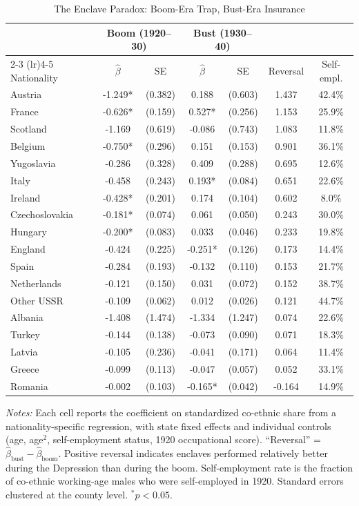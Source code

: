 \begin{table}[t]
\centering
\caption{The Enclave Paradox: Boom-Era Trap, Bust-Era Insurance}
\label{tab:paradox}
\begin{tabular}{lcccccc}
\hline\hline
 & \multicolumn{2}{c}{Boom (1920--30)} & \multicolumn{2}{c}{Bust (1930--40)} & & \\
\cmidrule(lr){2-3} \cmidrule(lr){4-5}
Nationality & $\hat{\beta}$ & SE & $\hat{\beta}$ & SE & Reversal & Self-empl. \\
\hline
Austria & -1.249* & (0.382) & 0.188 & (0.603) & 1.437 & 42.4\% \\
France & -0.626* & (0.159) & 0.527* & (0.256) & 1.153 & 25.9\% \\
Scotland & -1.169 & (0.619) & -0.086 & (0.743) & 1.083 & 11.8\% \\
Belgium & -0.750* & (0.296) & 0.151 & (0.153) & 0.901 & 36.1\% \\
Yugoslavia & -0.286 & (0.328) & 0.409 & (0.288) & 0.695 & 12.6\% \\
Italy & -0.458 & (0.243) & 0.193* & (0.084) & 0.651 & 22.6\% \\
Ireland & -0.428* & (0.201) & 0.174 & (0.104) & 0.602 & 8.0\% \\
Czechoslovakia & -0.181* & (0.074) & 0.061 & (0.050) & 0.243 & 30.0\% \\
Hungary & -0.200* & (0.083) & 0.033 & (0.046) & 0.233 & 19.8\% \\
England & -0.424 & (0.225) & -0.251* & (0.126) & 0.173 & 14.4\% \\
Spain & -0.284 & (0.193) & -0.132 & (0.110) & 0.153 & 21.7\% \\
Netherlands & -0.121 & (0.150) & 0.031 & (0.072) & 0.152 & 38.7\% \\
Other USSR & -0.109 & (0.062) & 0.012 & (0.026) & 0.121 & 44.7\% \\
Albania & -1.408 & (1.474) & -1.334 & (1.247) & 0.074 & 22.6\% \\
Turkey & -0.144 & (0.138) & -0.073 & (0.090) & 0.071 & 18.3\% \\
Latvia & -0.105 & (0.236) & -0.041 & (0.171) & 0.064 & 11.4\% \\
Greece & -0.099 & (0.113) & -0.047 & (0.057) & 0.052 & 33.1\% \\
Romania & -0.002 & (0.103) & -0.165* & (0.042) & -0.164 & 14.9\% \\
\hline\hline
\end{tabular}
\begin{minipage}{0.92\textwidth}\footnotesize
\textit{Notes:} Each cell reports the coefficient on standardized co-ethnic share from a nationality-specific regression, with state fixed effects and individual controls (age, age$^2$, self-employment status, 1920 occupational score). ``Reversal'' = $\hat{\beta}_{\text{bust}} - \hat{\beta}_{\text{boom}}$. Positive reversal indicates enclaves performed relatively better during the Depression than during the boom. Self-employment rate is the fraction of co-ethnic working-age males who were self-employed in 1920. Standard errors clustered at the county level. $^{*}p<0.05$.
\end{minipage}
\end{table}
